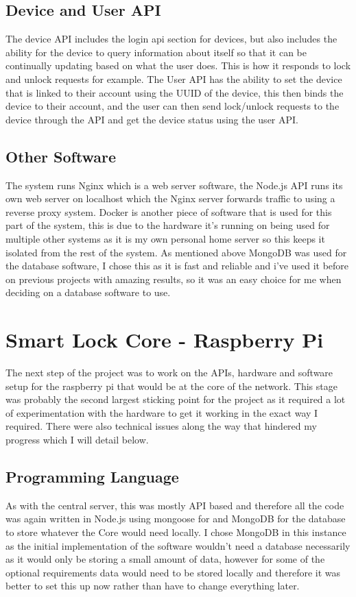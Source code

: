 \subsection{Device and User API}
The device API includes the login api section for devices, but also includes the ability for the device to query information about itself so that it can be continually updating based on what the user does. This is how it responds to lock and unlock requests for example. The User API has the ability to set the device that is linked to their account using the UUID of the device, this then binds the device to their account, and the user can then send lock/unlock requests to the device through the API and get the device status using the user API.

\subsection{Other Software}
The system runs Nginx which is a web server software, the Node.js API runs its own web server on localhost which the Nginx server forwards traffic to using a reverse proxy system. Docker is another piece of software that is used for this part of the system, this is due to the hardware it's running on being used for multiple other systems as it is my own personal home server so this keeps it isolated from the rest of the system. As mentioned above MongoDB was used for the database software, I chose this as it is fast and reliable and i've used it before on previous projects with amazing results, so it was an easy choice for me when deciding on a database software to use.

\section{Smart Lock Core - Raspberry Pi}
The next step of the project was to work on the APIs, hardware and software setup for the raspberry pi that would be at the core of the network. This stage was probably the second largest sticking point for the project as it required a lot of experimentation with the hardware to get it working in the exact way I required. There were also technical issues along the way that hindered my progress which I will detail below.

\subsection{Programming Language}
As with the central server, this was mostly API based and therefore all the code was again written in Node.js using mongoose for and MongoDB for the database to store whatever the Core would need locally. I chose MongoDB in this instance as the initial implementation of the software wouldn't need a database necessarily as it would only be storing a small amount of data, however for some of the optional requirements data would need to be stored locally and therefore it was better to set this up now rather than have to change everything later.

